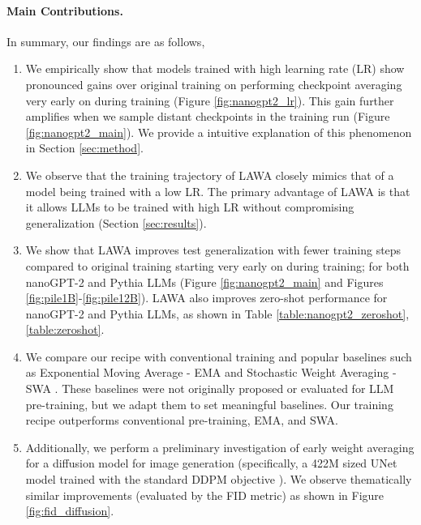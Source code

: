\documentclass{article}
\newcommand{\method}{LAWA}
\begin{document}
\paragraph{Main Contributions.} In summary, our findings are as follows,

\begin{enumerate}

\item We empirically show that models trained with high learning rate (LR) show pronounced gains over original training on performing checkpoint averaging very early on during training (Figure \ref{fig:nanogpt2_lr}). This gain further amplifies when we sample distant checkpoints in the training run (Figure \ref{fig:nanogpt2_main}). We provide a intuitive explanation of this phenomenon in Section \ref{sec:method}.

\item We observe that the training trajectory of \method{} closely mimics that of a model being trained with a low LR. The primary advantage of \method{} is that it allows LLMs to be trained with high LR without compromising generalization (Section \ref{sec:results}).

\item We show that \method{} improves test generalization with fewer training steps compared to original training starting very early on during training; for both nanoGPT-2 and Pythia LLMs (Figure \ref{fig:nanogpt2_main} and Figures \ref{fig:pile1B}-\ref{fig:pile12B}). \method{} also improves zero-shot performance for nanoGPT-2 and Pythia LLMs, as shown in Table \ref{table:nanogpt2_zeroshot}, \ref{table:zeroshot}.

\item We compare our recipe with conventional training and popular baselines such as Exponential Moving Average - EMA \citep{szegedy2015rethinking} and Stochastic Weight Averaging - SWA \citep{SWA}. These baselines were not originally proposed or evaluated for LLM pre-training, but we adapt them to set meaningful baselines. Our training recipe outperforms conventional pre-training, EMA, and SWA.

\item Additionally, we perform a preliminary investigation of early weight averaging for a diffusion model for image generation (specifically, a 422M sized UNet model trained with the standard DDPM objective \citep{ho2020denoising}). We observe thematically similar improvements (evaluated by the FID metric) as shown in Figure \ref{fig:fid_diffusion}. 

\end{enumerate}
\end{document}
